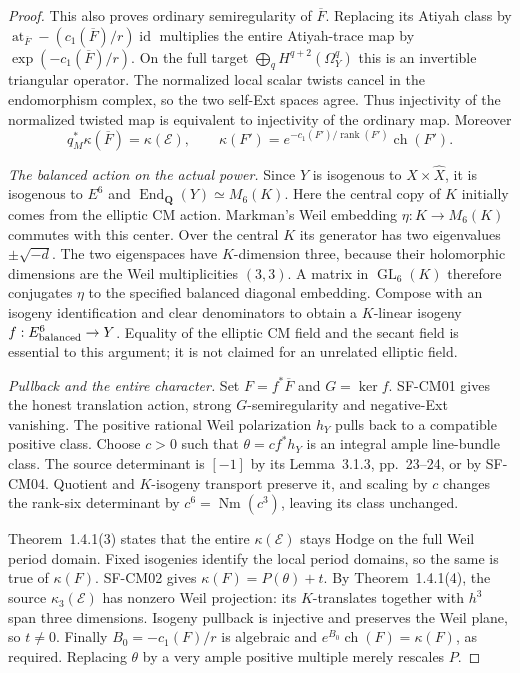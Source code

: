 \begin{proof}
This also proves ordinary semiregularity of $\overline F$.
Replacing its Atiyah class by
$\operatorname{at}_{\overline F}-(c_1(\overline F)/r)\operatorname{id}$
multiplies the entire Atiyah-trace map by
$\exp(-c_1(\overline F)/r)$. On the full target
$\bigoplus_qH^{q+2}(\Omega_Y^q)$ this is an invertible triangular
operator. The normalized local scalar twists cancel in the
endomorphism complex, so the two self-Ext spaces agree. Thus
injectivity of the normalized twisted map is equivalent to
injectivity of the ordinary map. Moreover
\[
 q_M^*\kappa(\overline F)=\kappa(\mathcal E),\qquad
 \kappa(F')=e^{-c_1(F')/\operatorname{rank}(F')}\operatorname{ch}(F').
\]

\emph{The balanced action on the actual power.} Since $Y$ is
isogenous to $X\times\widehat X$, it is isogenous to $E^6$ and
$\operatorname{End}_{\mathbf Q}(Y)\simeq M_6(K)$. Here the central
copy of $K$ initially comes from the elliptic CM action. Markman's
Weil embedding $\eta:K\to M_6(K)$ commutes with this center.
Over the central $K$ its generator has two eigenvalues
$\pm\sqrt{-d}$. The two eigenspaces have $K$-dimension three,
because their holomorphic dimensions are the Weil multiplicities
$(3,3)$. A matrix in $\operatorname{GL}_6(K)$ therefore conjugates
$\eta$ to the specified balanced diagonal embedding. Compose with
an isogeny identification and clear denominators to obtain a
$K$-linear isogeny $f:E^6_{\rm balanced}\to Y$. Equality of the
elliptic CM field and the secant field is essential to this
argument; it is not claimed for an unrelated elliptic field.

\emph{Pullback and the entire character.} Set $F=f^*\overline F$
and $G=\ker f$. SF-CM01 gives the honest translation action,
strong $G$-semiregularity and negative-Ext vanishing. The positive
rational Weil polarization $h_Y$ pulls back to a compatible
positive class. Choose $c>0$ such that $\theta=cf^*h_Y$ is an
integral ample line-bundle class. The source determinant is $[-1]$
by its Lemma~3.1.3, pp.~23--24, or by SF-CM04. Quotient and
$K$-isogeny transport preserve it, and scaling by $c$ changes the
rank-six determinant by $c^6=\operatorname{Nm}(c^3)$, leaving its
class unchanged.

Theorem~1.4.1(3) states that the entire $\kappa(\mathcal E)$ stays
Hodge on the full Weil period domain. Fixed isogenies identify the
local period domains, so the same is true of $\kappa(F)$.
SF-CM02 gives $\kappa(F)=P(\theta)+t$. By
Theorem~1.4.1(4), the source $\kappa_3(\mathcal E)$ has nonzero
Weil projection: its $K$-translates together with $h^3$ span three
dimensions. Isogeny pullback is injective and preserves the Weil
plane, so $t\ne0$. Finally $B_0=-c_1(F)/r$ is algebraic and
$e^{B_0}\operatorname{ch}(F)=\kappa(F)$, as required. Replacing
$\theta$ by a very ample positive multiple merely rescales $P$.
\end{proof}

